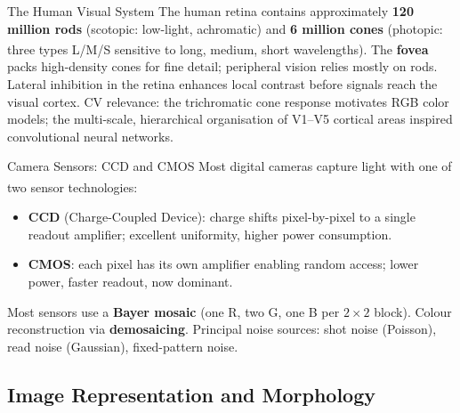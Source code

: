 \begin{v3topic}{The Human Visual System}
    The human retina contains approximately \textbf{120 million rods} (scotopic: low-light, achromatic) and
    \textbf{6 million cones} (photopic: three types L/M/S sensitive to long, medium, short wavelengths)\textsuperscript{\cite[][p.~57]{szeliski2022}}.
    The \textbf{fovea} packs high-density cones for fine detail; peripheral vision relies mostly on rods.
    Lateral inhibition in the retina enhances local contrast before signals reach the visual cortex.
\visualseparator
    CV relevance: the trichromatic cone response motivates RGB color models; the multi-scale,
    hierarchical organisation of V1--V5 cortical areas inspired convolutional neural networks.

\end{v3topic}
\begin{v3topic}{Camera Sensors: CCD and CMOS}
    Most digital cameras capture light with one of two sensor technologies\textsuperscript{\cite[][pp.~68--73]{jahneDigitalImageProcessing2005}}:
    \begin{itemize}
        \item \textbf{CCD} (Charge-Coupled Device): charge shifts pixel-by-pixel to a single readout amplifier; excellent uniformity, higher power consumption.
        \item \textbf{CMOS}: each pixel has its own amplifier enabling random access; lower power, faster readout, now dominant.
    \end{itemize}
    Most sensors use a \textbf{Bayer mosaic} (one R, two G, one B per $2{\times}2$ block).
    Colour reconstruction via \textbf{demosaicing}.
    Principal noise sources: shot noise (Poisson), read noise (Gaussian), fixed-pattern noise.
\end{v3topic}

\subsection{Image Representation and Morphology}

